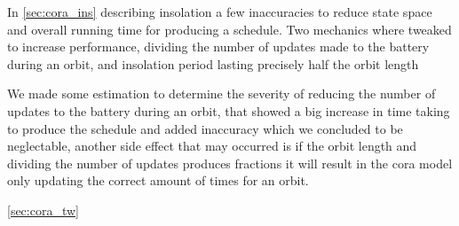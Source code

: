 In \cref{sec:cora_ins} describing insolation a few inaccuracies to reduce state space and overall running time for producing a schedule. Two mechanics where tweaked to increase performance, dividing the number of updates made to the battery during an orbit, and insolation period lasting precisely half the orbit length 

We made some estimation to determine the severity of reducing the number of updates to the battery during an orbit, that showed a big increase in time taking to produce the schedule and added inaccuracy which we concluded to be neglectable, another side effect that may occurred is if the orbit length and dividing the number of updates produces fractions it will result in the \gls{cora} model only updating the correct amount of times for an orbit.






 \cref{sec:cora_tw} 
